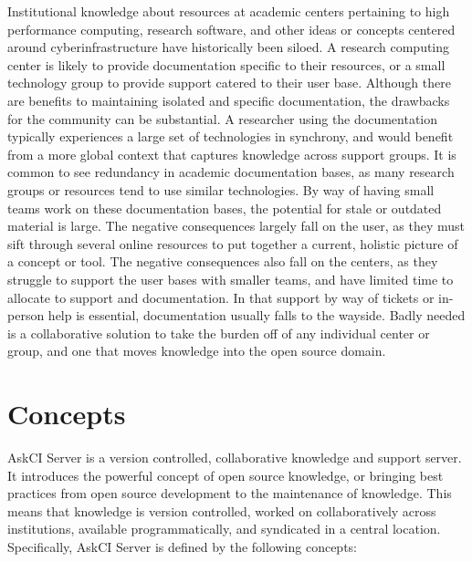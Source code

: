 \documentclass{jors}
\begin{document}
Institutional knowledge about resources at academic centers pertaining to high performance computing,
research software, and other ideas or concepts centered around cyberinfrastructure have historically been
siloed. A research computing center is likely to provide documentation specific to their resources, or 
a small technology group to provide support catered to their user base. Although there are benefits to
maintaining isolated and specific documentation, the drawbacks for the community can be substantial.
A researcher using the documentation typically experiences a large set of technologies in synchrony,
and would benefit from a more global context that captures knowledge across support groups.
 It is common to see redundancy in academic documentation bases, as many research groups or resources tend to use
similar technologies. By way of having small teams work on these documentation bases, the potential for
stale or outdated material is large. The negative consequences largely fall on the user, as they must
sift through several online resources to put together a current, holistic picture of a concept or tool.
The negative consequences also fall on the centers, as they struggle to support the user bases with
smaller teams, and have limited time to allocate to support and documentation. In that support by way
of tickets or in-person help is essential, documentation usually falls to the wayside.
Badly needed is a collaborative solution to take the burden off of any individual center or group, and
one that moves knowledge into the open source domain.

\section*{Concepts}

AskCI Server \cite{askci-server} is a version controlled, collaborative knowledge and support server. It
introduces the powerful concept of open source knowledge, or bringing best practices from open source development
to the maintenance of knowledge. This means that knowledge is version controlled, worked on collaboratively
across institutions, available programmatically, and syndicated in a central location. 
Specifically, AskCI Server is defined by the following concepts:
\newline

\thispagestyle{empty} 
\end{document}
